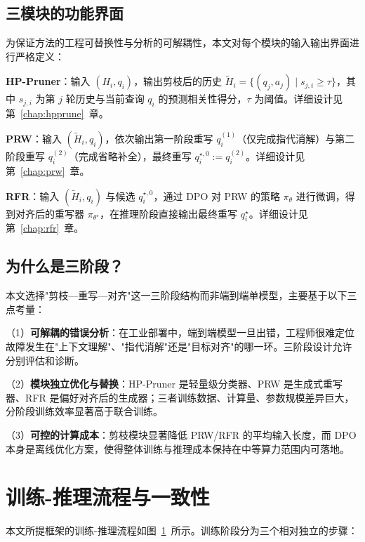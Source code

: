 \subsection{三模块的功能界面}

为保证方法的工程可替换性与分析的可解耦性，本文对每个模块的输入输出界面进行严格定义：

\textbf{HP-Pruner}：输入 $(H_i, q_i)$，输出剪枝后的历史 $\tilde H_i = \{(q_{j}, a_{j})\mid s_{j,i} \geq \tau\}$，其中 $s_{j,i}$ 为第 $j$ 轮历史与当前查询 $q_i$ 的预测相关性得分，$\tau$ 为阈值。详细设计见第~\ref{chap:hpprune}~章。

\textbf{PRW}：输入 $(\tilde H_i, q_i)$，依次输出第一阶段重写 $q_i^{(1)}$（仅完成指代消解）与第二阶段重写 $q_i^{(2)}$（完成省略补全），最终重写 $q_i^{\star,0} := q_i^{(2)}$。详细设计见第~\ref{chap:prw}~章。

\textbf{RFR}：输入 $(\tilde H_i, q_i)$ 与候选 $q_i^{\star,0}$，通过 DPO 对 PRW 的策略 $\pi_\theta$ 进行微调，得到对齐后的重写器 $\pi_{\theta^\star}$，在推理阶段直接输出最终重写 $q_i^\star$。详细设计见第~\ref{chap:rfr}~章。

\subsection{为什么是三阶段？}

本文选择"剪枝—重写—对齐"这一三阶段结构而非端到端单模型，主要基于以下三点考量：

（1）\textbf{可解耦的错误分析}：在工业部署中，端到端模型一旦出错，工程师很难定位故障发生在"上下文理解"、"指代消解"还是"目标对齐"的哪一环。三阶段设计允许分别评估和诊断。

（2）\textbf{模块独立优化与替换}：HP-Pruner 是轻量级分类器、PRW 是生成式重写器、RFR 是偏好对齐后的生成器；三者训练数据、计算量、参数规模差异巨大，分阶段训练效率显著高于联合训练。

（3）\textbf{可控的计算成本}：剪枝模块显著降低 PRW/RFR 的平均输入长度，而 DPO 本身是离线优化方案，使得整体训练与推理成本保持在中等算力范围内可落地。

\section{训练-推理流程与一致性}
\label{sec:pipeline}

本文所提框架的训练-推理流程如图~\ref{fig:pipeline_flow}~所示。训练阶段分为三个相对独立的步骤：

\begin{figure}[t]
\centering
{}
\label{fig:pipeline_flow}
\end{figure}

